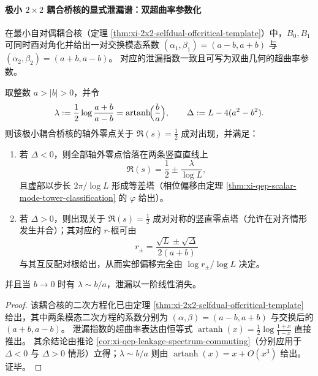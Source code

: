 \paragraph{极小 \texorpdfstring{$2\times2$}{2x2} 耦合桥核的显式泄漏谱：双超曲率参数化}
在最小自对偶耦合核（定理 \ref{thm:xi-2x2-selfdual-offcritical-template}）中，\(B_0,B_1\) 可同时酉对角化并给出一对交换模态系数
\(
(\alpha_1,\beta_1)=(a-b,a+b)
\)
与
\(
(\alpha_2,\beta_2)=(a+b,a-b)
\)。
对应的泄漏指数一致且可写为双曲几何的超曲率参数。

\begin{corollary}[极小耦合的泄漏指数与零点几何]\label{cor:xi-2x2-coupling-leakage-artanh}
取整数 \(a>|b|>0\)，并令
\[
\lambda:=\frac12\log\frac{a+b}{a-b}=\operatorname{artanh}\!\Bigl(\frac{b}{a}\Bigr),
\qquad
\Delta:=L-4(a^2-b^2).
\]
则该极小耦合桥核的轴外零点关于 \(\Re(s)=\tfrac12\) 成对出现，并满足：
\begin{enumerate}
  \item 若 \(\Delta<0\)，则全部轴外零点恰落在两条竖直直线上
  \[
  \Re(s)=\frac12\pm\frac{\lambda}{\log L},
  \]
  且虚部以步长 \(2\pi/\log L\) 形成等差塔（相位偏移由定理 \ref{thm:xi-qep-scalar-mode-tower-classification} 的 \(\varphi\) 给出）。
  \item 若 \(\Delta>0\)，则出现关于 \(\Re(s)=\tfrac12\) 成对对称的竖直零点塔（允许在对齐情形发生并合）；其对应的 \(r\)-根可由
  \[
  r_{\pm}=\frac{\sqrt L\pm\sqrt{\Delta}}{2(a+b)}
  \]
  与其互反配对根给出，从而实部偏移完全由 \(\log r_{\pm}/\log L\) 决定。
\end{enumerate}
并且当 \(b\to 0\) 时有 \(\lambda\sim b/a\)，泄漏以一阶线性消失。
\end{corollary}

\begin{proof}
该耦合核的二次方程化已由定理 \ref{thm:xi-2x2-selfdual-offcritical-template} 给出，其中两条模态二次方程的系数分别为 \((\alpha,\beta)=(a-b,a+b)\) 与交换后的 \((a+b,a-b)\)。
泄漏指数的超曲率表达由恒等式
\(
\operatorname{artanh}(x)=\tfrac12\log\frac{1+x}{1-x}
\)
直接推出。
其余结论由推论 \ref{cor:xi-qep-leakage-spectrum-commuting}（分别应用于 \(\Delta<0\) 与 \(\Delta>0\) 情形）立得；\(\lambda\sim b/a\) 则由 \(\operatorname{artanh}(x)=x+O(x^3)\) 给出。证毕。
\end{proof}

